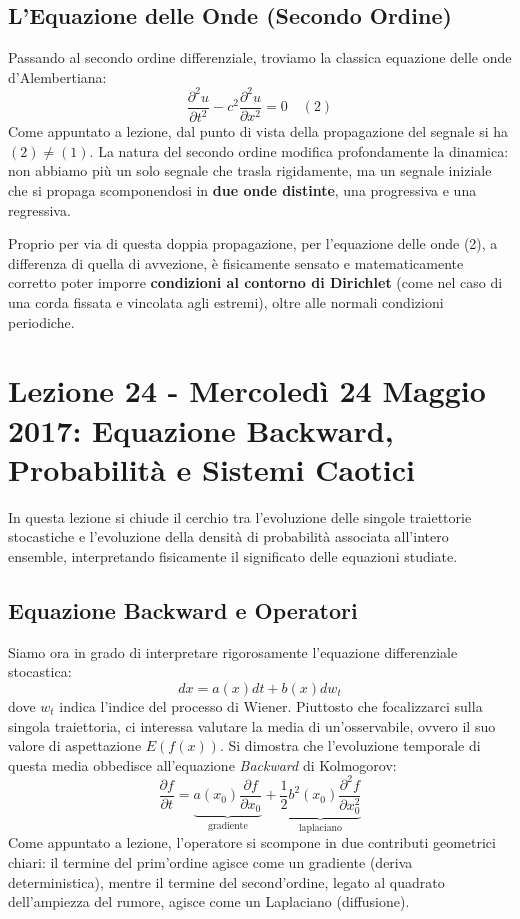 \documentclass[12pt,a4paper]{article}
\begin{document}
\subsection{L'Equazione delle Onde (Secondo Ordine)}
Passando al secondo ordine differenziale, troviamo la classica equazione delle onde d'Alembertiana:
\begin{equation}
\frac{\partial^2 u}{\partial t^2} - c^2 \frac{\partial^2 u}{\partial x^2} = 0 \quad (2)
\end{equation}
Come appuntato a lezione, dal punto di vista della propagazione del segnale si ha $(2) \neq (1)$. La natura del secondo ordine modifica profondamente la dinamica: non abbiamo più un solo segnale che trasla rigidamente, ma un segnale iniziale che si propaga scomponendosi in \textbf{due onde distinte}, una progressiva e una regressiva.

Proprio per via di questa doppia propagazione, per l'equazione delle onde (2), a differenza di quella di avvezione, è fisicamente sensato e matematicamente corretto poter imporre \textbf{condizioni al contorno di Dirichlet} (come nel caso di una corda fissata e vincolata agli estremi), oltre alle normali condizioni periodiche.

\newpage
\section{Lezione 24 - Mercoledì 24 Maggio 2017: Equazione Backward, Probabilità e Sistemi Caotici}

In questa lezione si chiude il cerchio tra l'evoluzione delle singole traiettorie stocastiche e l'evoluzione della densità di probabilità associata all'intero ensemble, interpretando fisicamente il significato delle equazioni studiate.

\subsection{Equazione Backward e Operatori}
Siamo ora in grado di interpretare rigorosamente l'equazione differenziale stocastica:
\begin{equation}
dx = a(x)dt + b(x)dw_t
\end{equation}
dove $w_t$ indica l'indice del processo di Wiener.
Piuttosto che focalizzarci sulla singola traiettoria, ci interessa valutare la media di un'osservabile, ovvero il suo valore di aspettazione $E(f(x))$.
Si dimostra che l'evoluzione temporale di questa media obbedisce all'equazione \textit{Backward} di Kolmogorov:
\begin{equation}
\frac{\partial f}{\partial t} = \underbrace{a(x_0) \frac{\partial f}{\partial x_0}}_{\text{gradiente}} + \underbrace{\frac{1}{2} b^2(x_0) \frac{\partial^2 f}{\partial x_0^2}}_{\text{laplaciano}}
\end{equation}
Come appuntato a lezione, l'operatore si scompone in due contributi geometrici chiari: il termine del prim'ordine agisce come un gradiente (deriva deterministica), mentre il termine del second'ordine, legato al quadrato dell'ampiezza del rumore, agisce come un Laplaciano (diffusione).
\end{document}
